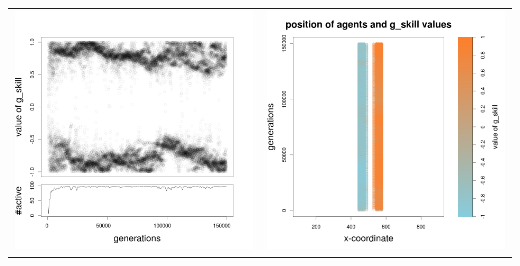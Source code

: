 \documentclass[a4paper,10pt]{article}
\begin{document}
\begin{table}[h!]
\begin{tabular}{cc}
 \newline
 \includegraphics[width=\imgSize]{images/5StaticEnv/Gplot62_staticEnv4}&\includegraphics[width=\imgSize]{images/5StaticEnv/Gplot62Static_staticEnv4}\\

\end{tabular}
\end{table}
\end{document}
